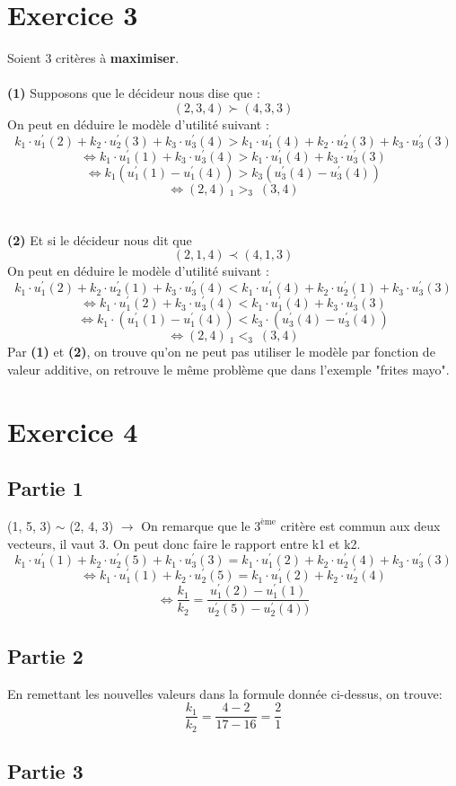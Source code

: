 \documentclass[a4paper, 12pt]{article}
\begin{document}
	\section*{Exercice 3}
		Soient 3 critères à \textbf{maximiser}.\\
		~\\
		\textbf{(1)} Supposons que le décideur nous dise que :
		$$ (2, 3, 4) \succ (4, 3, 3) $$
		On peut en déduire le modèle d'utilité suivant :
		$$ k_1 \cdot u^{'}_{1}(2) + k_2 \cdot u^{'}_{2}(3) + 
		   k_3 \cdot u^{'}_{3}(4) >
		   k_1 \cdot u^{'}_{1}(4) + k_2 \cdot u^{'}_{2}(3) + 
		   k_3 \cdot u^{'}_{3}(3) $$
		$$ \Leftrightarrow 
		   k_1 \cdot u^{'}_{1}(1) + k_3 \cdot u^{'}_{3}(4) >
		   k_1 \cdot u^{'}_{1}(4) + k_3 \cdot u^{'}_{3}(3) $$
		$$ \Leftrightarrow 
		   k_1 (u^{'}_{1}(1) - u^{'}_{1}(4)) > 
		   k_3 (u^{'}_{3}(4) - u^{'}_{3}(4)) $$
		$$ \Leftrightarrow 
		   (2, 4)\ _1>_3\ (3, 4) $$
		\\~\\
		\textbf{(2)} Et si le décideur nous dit que 
		$$ (2, 1, 4) \prec (4, 1, 3) $$
		On peut en déduire le modèle d'utilité suivant :
		$$ k_1 \cdot u^{'}_{1}(2) + k_2 \cdot u^{'}_{2}(1) + 
		   k_3 \cdot u^{'}_{3}(4) <
		   k_1 \cdot u^{'}_{1}(4) + k_2 \cdot u^{'}_{2}(1) + 
		   k_3 \cdot u^{'}_{3}(3) $$
		$$ \Leftrightarrow 
		   k_1 \cdot u^{'}_{1}(2) + k_3 \cdot u^{'}_{3}(4) <
		   k_1 \cdot u^{'}_{1}(4) + k_3 \cdot u^{'}_{3}(3) $$
		$$ \Leftrightarrow 
		   k_1 \cdot (u^{'}_{1}(1) - u^{'}_{1}(4)) < 
		   k_3 \cdot (u^{'}_{3}(4) - u^{'}_{3}(4)) $$
		$$ \Leftrightarrow 
		   (2, 4)\ _1<_3\ (3, 4) $$
		Par \textbf{(1)} et \textbf{(2)}, on trouve qu'on ne peut pas
		utiliser le modèle par fonction de valeur
		additive, on retrouve le même problème que dans l'exemple 
		"frites mayo".
	\section*{Exercice 4}
		\subsection*{Partie 1}
			(1, 5, 3) $\sim$ (2, 4, 3) $\rightarrow$ On remarque que le 
				$3^{\text{ème}}$ critère est commun aux deux vecteurs, 
				il vaut 3. On peut donc faire le rapport entre k1 et k2.
				$$ k_1\cdot u^{'}_{1}(1) + k_2\cdot u^{'}_{2}(5) + 
				k_1\cdot u^{'}_{3}(3) = k_1\cdot u^{'}_{1}(2) + 
				k_2\cdot u^{'}_{2}(4) + k_3\cdot u^{'}_{3}(3) $$
				$$ \Leftrightarrow 
				k_1\cdot u^{'}_{1}(1) + 
				k_2\cdot u^{'}_{2}(5) = k_1\cdot u^{'}_{1}(2) + 
				k_2\cdot u^{'}_{2}(4) $$
				$$ \Leftrightarrow 
					\frac{k_1}{k_2} = 
					\frac{u^{'}_{1}(2) - u^{'}_{1}(1)}
						 {u^{'}_{2}(5) - u^{'}_{2}(4))}$$
		\subsection*{Partie 2}
			En remettant les nouvelles valeurs dans la formule donnée 
			ci-dessus, on trouve:
			$$ \frac{k_1}{k_2} = \frac{4 - 2}{17 - 16} = \frac{2}{1}$$
		\subsection*{Partie 3}
			
\end{document}
